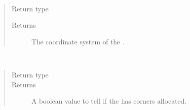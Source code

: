 \documentclass[letterpaper,10pt,english]{sphinxmanual}
\begin{document}
\begin{fulllineitems}
\begin{fulllineitems}
\begin{quote}
\begin{description}
\end{description}\end{quote}

\end{fulllineitems}


\begin{fulllineitems}
\label{\detokenize{grid:ESMF.api.grid.Grid.coord_sys}}~\begin{quote}\begin{description}
\item[{Return type}] \leavevmode
{\hyperref[\detokenize{CoordSys:ESMF.api.constants.CoordSys}]{}}

\item[{Returns}] \leavevmode
The coordinate system of the {\hyperref[\detokenize{grid:ESMF.api.grid.Grid}]{}}.

\end{description}\end{quote}

\end{fulllineitems}


\begin{fulllineitems}
\label{\detokenize{grid:ESMF.api.grid.Grid.has_corners}}~\begin{quote}\begin{description}
\item[{Return type}] \leavevmode
{}

\item[{Returns}] \leavevmode
A boolean value to tell if the {\hyperref[\detokenize{grid:ESMF.api.grid.Grid}]{}}
has corners allocated.

\end{description}\end{quote}

\end{fulllineitems}


\end{fulllineitems}
\end{document}
